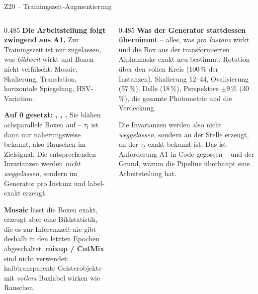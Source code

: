 \documentclass[14pt,aspectratio=169]{beamer}
\begin{document}
\begin{frame}{Z20 -- Trainingszeit-Augmentierung}
\zusatzdicht
\begin{columns}[T,onlytextwidth]
\begin{column}{0.485\textwidth}
\textbf{Die Arbeitsteilung folgt zwingend aus A1.} Zur Trainingszeit ist nur
zugelassen, was \emph{bildweit} wirkt und Boxen nicht verfälscht: Mosaic,
Skalierung, Translation, horizontale Spiegelung, HSV-Variation.
\smallskip

{\color{warn}\textbf{Auf 0 gesetzt: , ,
.}} Sie blähen achsparallele Boxen auf -- $\tau_t$ ist dann
nur näherungsweise bekannt, also Rauschen im Zielsignal. Die entsprechenden
Invarianzen werden \emph{nicht weggelassen}, sondern im Generator pro Instanz
und label-exakt erzeugt.
\smallskip

\textbf{Mosaic} lässt die Boxen exakt, erzeugt aber eine Bildstatistik, die
es zur Inferenzzeit nie gibt -- deshalb in den letzten Epochen abgeschaltet.
\textbf{mixup / CutMix} sind nicht verwendet: halbtransparente
Geisterobjekte mit \emph{vollem} Boxlabel wirken wie Rauschen.
\end{column}
\begin{column}{0.485\textwidth}
\textbf{Was der Generator stattdessen übernimmt} -- alles, was \emph{pro
Instanz} wirkt und die Box aus der transformierten Alphamaske exakt neu
bestimmt: Rotation über den vollen Kreis (100\,\% der Instanzen),
Skalierung 12--44\px, Ovalisierung (57\,\%), Delle (18\,\%), Perspektive
$\pm 9\,\%$ (30\,\%), die gesamte Photometrie und die Verdeckung.
\smallskip

{\color{akzent}Die Invarianzen werden also nicht \emph{weggelassen}, sondern
an der Stelle erzeugt, an der $\tau_t$ exakt bekannt ist. Das ist Anforderung
A1 in Code gegossen -- und der Grund, warum die Pipeline überhaupt eine
Arbeitsteilung hat.}
\end{column}
\end{columns}
\end{frame}
\end{document}
